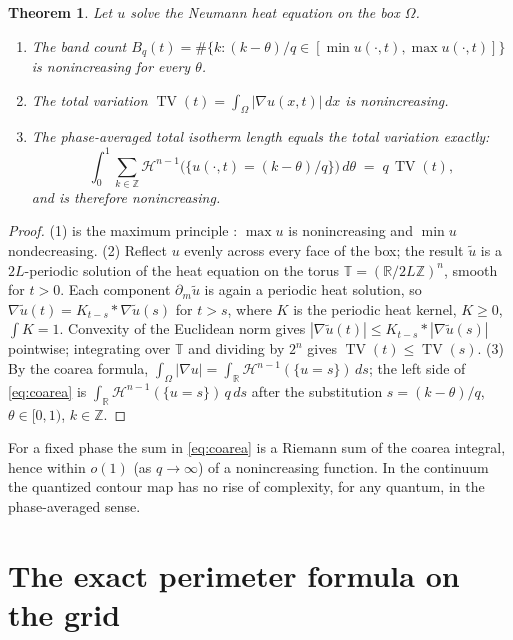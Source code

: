 \documentclass[11pt,a4paper]{article}
\newtheorem{theorem}{Theorem}[section]
\theoremstyle{definition}
\theoremstyle{remark}
\newcommand{\R}{\mathbb{R}}
\newcommand{\Z}{\mathbb{Z}}
\newcommand{\TV}{\operatorname{TV}}
\begin{document}
\begin{theorem}\label{thm:cont}
Let $u$ solve the Neumann heat equation on the box $\Omega$.
\begin{enumerate}
\item The band count $B_q(t)=\#\{k:(k-\theta)/q\in[\min u(\cdot,t),\max u(\cdot,t)]\}$ is nonincreasing for every $\theta$.
\item The total variation $\TV(t)=\int_\Omega|\nabla u(x,t)|\,dx$ is nonincreasing.
\item The phase-averaged total isotherm length equals the total variation exactly:
\begin{equation}\label{eq:coarea}
  \int_0^1\sum_{k\in\Z}\mathcal H^{n-1}\bigl(\{u(\cdot,t)=(k-\theta)/q\}\bigr)\,d\theta
  \;=\; q\,\TV(t),
\end{equation}
and is therefore nonincreasing.
\end{enumerate}
\end{theorem}

\begin{proof}
(1) is the maximum principle \cite{Evans}: $\max u$ is nonincreasing and $\min u$
nondecreasing. (2) Reflect $u$ evenly across every face of the box; the
result $\tilde u$ is a $2L$-periodic solution of the heat equation on the
torus $\mathbb T=(\R/2L\Z)^n$, smooth for $t>0$. Each component
$\partial_m\tilde u$ is again a periodic heat solution, so
$\nabla\tilde u(t)=K_{t-s}*\nabla\tilde u(s)$ for $t>s$, where $K$ is the
periodic heat kernel, $K\ge0$, $\int K=1$. Convexity of the Euclidean
norm gives $|\nabla\tilde u(t)|\le K_{t-s}*|\nabla\tilde u(s)|$
pointwise; integrating over $\mathbb T$ and dividing by $2^n$ gives
$\TV(t)\le\TV(s)$. (3) By the coarea formula,
$\int_\Omega|\nabla u|=\int_\R\mathcal H^{n-1}(\{u=s\})\,ds$; the left
side of \eqref{eq:coarea} is $\int_\R\mathcal H^{n-1}(\{u=s\})\,q\,ds$
after the substitution $s=(k-\theta)/q$, $\theta\in[0,1)$, $k\in\Z$.
\end{proof}

For a fixed phase the sum in \eqref{eq:coarea} is a Riemann sum of the
coarea integral, hence within $o(1)$ (as $q\to\infty$) of a
nonincreasing function. In the continuum the quantized contour map has
no rise of complexity, for any quantum, in the phase-averaged sense.

\section{The exact perimeter formula on the grid}\label{sec:grid}
\end{document}
